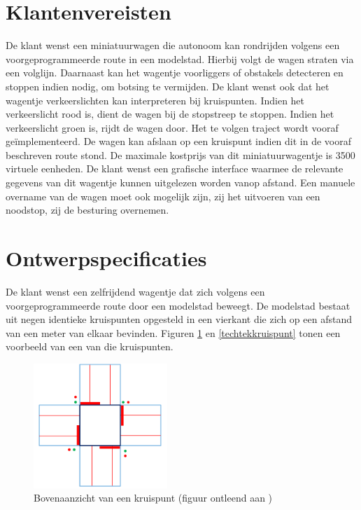 \documentclass[a4paper,kulak]{kulakarticle}
\begin{document}
\begin{appendices}
\begin{table}[h!]
\begin{tabular}{|l|r|r|r|}
	\end{tabular}
\end{table}
\section{Klantenvereisten}
	\renewcommand\refname{} %

De klant wenst een miniatuurwagen die autonoom kan rondrijden volgens een voorgeprogrammeerde route in een modelstad. Hierbij volgt de wagen straten via een volglijn. Daarnaast kan het wagentje voorliggers of obstakels detecteren en stoppen indien nodig, om botsing te vermijden. De klant wenst ook dat het wagentje verkeerslichten kan interpreteren bij kruispunten. Indien het verkeerslicht rood is, dient de wagen bij de stopstreep te stoppen. Indien het verkeerslicht groen is, rijdt de wagen door.  Het te volgen traject wordt vooraf geïmplementeerd. De wagen kan afslaan op een kruispunt indien dit in de vooraf beschreven route stond. De maximale kostprijs van dit miniatuurwagentje is 3500 virtuele eenheden. De klant wenst een grafische interface waarmee de relevante gegevens van dit wagentje kunnen uitgelezen worden vanop afstand. Een manuele overname van de wagen moet ook mogelijk zijn, zij het uitvoeren van een noodstop, zij de besturing overnemen.

\section{Ontwerpspecificaties}
\renewcommand\refname{} %

De klant wenst een zelfrijdend wagentje dat zich volgens een voorgeprogrammeerde route door een modelstad beweegt. De modelstad bestaat uit negen identieke kruispunten opgesteld in een vierkant die zich op een afstand van een meter van elkaar bevinden. Figuren \ref{kruispunt} en \ref{techtekkruispunt} tonen een voorbeeld van een van die kruispunten.

\begin{figure}[h]
	\centering
	\includegraphics[width=0.45\textwidth]{kruispunt.png}
	\caption{Bovenaanzicht van een kruispunt (figuur ontleend aan \cite{opgave})}
	\label{kruispunt}
\end{figure}



\end{appendices}
\end{document}
